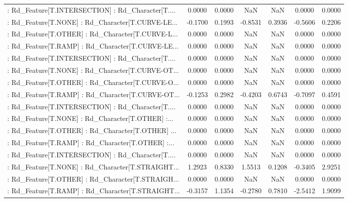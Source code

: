 \begin{longtable}{p{4cm}cccccc}
 : Rd\_Feature[T.INTERSECTION] : Rd\_Character[T.... &  0.0000 &    0.0000 &     NaN &          NaN &  0.0000 &  0.0000 \\
 : Rd\_Feature[T.NONE] : Rd\_Character[T.CURVE-LE... & -0.1700 &    0.1993 & -0.8531 &       0.3936 & -0.5606 &  0.2206 \\
 : Rd\_Feature[T.OTHER] : Rd\_Character[T.CURVE-L... &  0.0000 &    0.0000 &     NaN &          NaN &  0.0000 &  0.0000 \\
 : Rd\_Feature[T.RAMP] : Rd\_Character[T.CURVE-LE... &  0.0000 &    0.0000 &     NaN &          NaN &  0.0000 &  0.0000 \\
 : Rd\_Feature[T.INTERSECTION] : Rd\_Character[T.... &  0.0000 &    0.0000 &     NaN &          NaN &  0.0000 &  0.0000 \\
 : Rd\_Feature[T.NONE] : Rd\_Character[T.CURVE-OT... &  0.0000 &    0.0000 &     NaN &          NaN &  0.0000 &  0.0000 \\
 : Rd\_Feature[T.OTHER] : Rd\_Character[T.CURVE-O... &  0.0000 &    0.0000 &     NaN &          NaN &  0.0000 &  0.0000 \\
 : Rd\_Feature[T.RAMP] : Rd\_Character[T.CURVE-OT... & -0.1253 &    0.2982 & -0.4203 &       0.6743 & -0.7097 &  0.4591 \\
 : Rd\_Feature[T.INTERSECTION] : Rd\_Character[T.... &  0.0000 &    0.0000 &     NaN &          NaN &  0.0000 &  0.0000 \\
 : Rd\_Feature[T.NONE] : Rd\_Character[T.OTHER] :... &  0.0000 &    0.0000 &     NaN &          NaN &  0.0000 &  0.0000 \\
 : Rd\_Feature[T.OTHER] : Rd\_Character[T.OTHER] ... &  0.0000 &    0.0000 &     NaN &          NaN &  0.0000 &  0.0000 \\
 : Rd\_Feature[T.RAMP] : Rd\_Character[T.OTHER] :... &  0.0000 &    0.0000 &     NaN &          NaN &  0.0000 &  0.0000 \\
 : Rd\_Feature[T.INTERSECTION] : Rd\_Character[T.... &  0.0000 &    0.0000 &     NaN &          NaN &  0.0000 &  0.0000 \\
 : Rd\_Feature[T.NONE] : Rd\_Character[T.STRAIGHT... &  1.2923 &    0.8330 &  1.5513 &       0.1208 & -0.3405 &  2.9251 \\
 : Rd\_Feature[T.OTHER] : Rd\_Character[T.STRAIGH... &  0.0000 &    0.0000 &     NaN &          NaN &  0.0000 &  0.0000 \\
 : Rd\_Feature[T.RAMP] : Rd\_Character[T.STRAIGHT... & -0.3157 &    1.1354 & -0.2780 &       0.7810 & -2.5412 &  1.9099 \\

\end{longtable}
